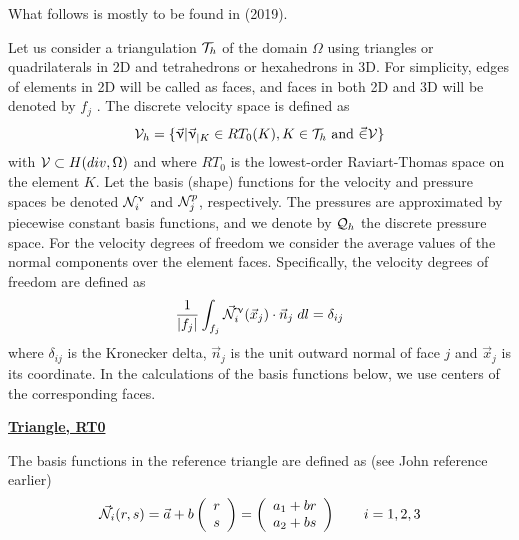 \newpage
What follows is mostly to be found in \textcite{weso19} (2019).

Let us consider a triangulation ${\cal T}_h$ of the domain $\Omega$ 
using triangles or quadrilaterals in 2D and tetrahedrons or
hexahedrons in 3D. For simplicity, edges of elements in 2D will be called as faces, 
and faces in both 2D and 3D will be denoted by $f_j$ . The discrete velocity space is defined as 
\cite{ergu21_72}
\[
{\cal V}_h = \{ \vec{\upnu} | \vec{\upnu}_{|K}  \in RT_0(K) , K\in {\cal T}_h \text{ and } \vec\in {\cal V} \}
\]
with ${\cal V} \subset H(div,\Omega)$ and
where $RT_0$ is the lowest-order Raviart-Thomas space on the element $K$. 
Let the basis (shape) functions for the velocity and pressure spaces be denoted ${\mathcal{N}}^\upnu_i$ and 
${\mathcal{N}}^p_j$, respectively. The pressures are approximated by piecewise
constant basis functions, and we denote by ${\cal Q}_h$ the discrete pressure space. For the velocity degrees of freedom we
consider the average values of the normal components over the element faces. Specifically, the velocity degrees of
freedom are defined as
\begin{equation}
\frac{1}{|f_j|} \int_{f_j} \vec{{\mathcal{N}}}^\upnu_i( \vec{x}_j) \cdot \vec{n}_j \; dl = \delta_{ij} 
\label{eq:RTbfdef}
\end{equation}
where $\delta_{ij}$ is the Kronecker delta, $\vec{n}_j$ is the unit outward normal of face $j$ 
and $\vec{x}_j$ is its coordinate. In the calculations
of the basis functions below, we use centers of the corresponding faces.

\underline{\bf Triangle, RT0}

\begin{center}
\end{center}


The basis functions in the reference triangle are defined as (see John reference earlier)
\[
\vec{{\mathcal{N}}}_i(r,s)
=\vec{a} + b  \left(\begin{array}{c} r\\s \end{array}\right)
=\left(\begin{array}{c} a_1+b r \\ a_2 + b s \end{array}\right)
\qquad i=1,2,3
\]

